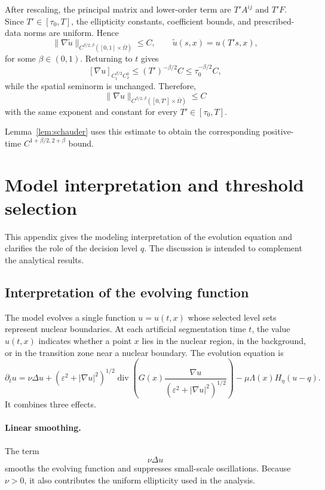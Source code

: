 \documentclass[11pt]{article}
\theoremstyle{remark}
\newcommand{\eps}{\varepsilon}
\newcommand{\nupar}{\nu}
\begin{document}
After rescaling, the principal matrix and lower-order term are $T'A^{ij}$
and $T'F$. Since $T'\in[\tau_0,T]$, the ellipticity constants, coefficient
bounds, and prescribed-data norms are uniform. Hence
\[
\|\nabla\widetilde u\|_{C^{\beta/2,\beta}
([0,1]\times\overline\Omega)}\le C,
\qquad
\widetilde u(s,x)=u(T's,x),
\]
for some $\beta\in(0,1)$. Returning to $t$ gives
\[
[\nabla u]_{C_t^{\beta/2}C_x^0}
\le (T')^{-\beta/2}C
\le\tau_0^{-\beta/2}C,
\]
while the spatial seminorm is unchanged. Therefore,
\[
\|\nabla u\|_{C^{\beta/2,\beta}
([0,T']\times\overline\Omega)}\le C
\]
with the same exponent and constant for every $T'\in[\tau_0,T]$.

Lemma~\ref{lem:schauder} uses this estimate to obtain the corresponding
positive-time $C^{1+\beta/2,2+\beta}$ bound.


\section{Model interpretation and threshold selection}
\label{app:model-interpretation}

This appendix gives the modeling interpretation of the evolution equation and clarifies the role of the decision level $q$.  The discussion is intended to complement the analytical results.

\subsection{Interpretation of the evolving function}

The model evolves a single function $u=u(t,x)$ whose selected level sets represent nuclear boundaries.  At each artificial segmentation time $t$, the value $u(t,x)$ indicates whether a point $x$ lies in the nuclear region, in the background, or in the transition zone near a nuclear boundary.  The evolution equation is
\begin{equation}\label{eq:appendix-model}
\partial_t u
=
\nupar\Delta u
+
\left(\eps^2+|\nabla u|^2\right)^{1/2}
\operatorname{div}\!\left(
G(x)\frac{\nabla u}{\left(\eps^2+|\nabla u|^2\right)^{1/2}}
\right)
-
\mu\Lambda(x)H_\eta(u-q).
\end{equation}
It combines three effects.

\paragraph{Linear smoothing.}
The term
\[
\nupar\Delta u
\]
smooths the evolving function and suppresses small-scale oscillations.  Because $\nupar>0$, it also contributes the uniform ellipticity used in the analysis.
\end{document}
